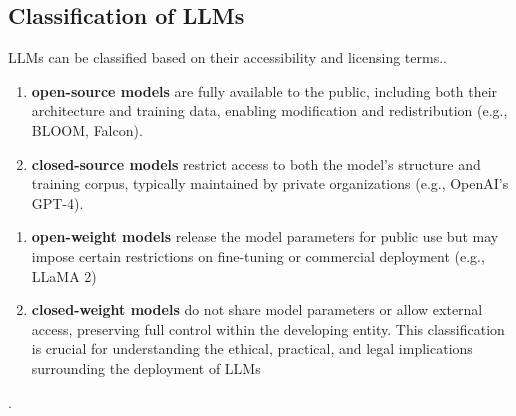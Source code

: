 \subsection{Classification of LLMs}
LLMs can be classified based on their accessibility and licensing terms.\citep{openlm2023survey}.
\begin{enumerate}
	\item \textbf{open-source models} are fully available to the public, including both their architecture and training data, enabling modification and redistribution (e.g., BLOOM, Falcon).
	\item  \textbf{closed-source models} restrict access to both the model's structure and training corpus, typically maintained by private organizations (e.g., OpenAI's GPT-4). 
\end{enumerate}
\begin{enumerate}
	\item   \textbf{open-weight models} release the model parameters for public use but may impose certain restrictions on fine-tuning or commercial deployment (e.g., LLaMA 2)
	\item   \textbf{closed-weight models} do not share model parameters or allow external access, preserving full control within the developing entity. This classification is crucial for understanding the ethical, practical, and legal implications surrounding the deployment of LLMs 
	
\end{enumerate}.
 
